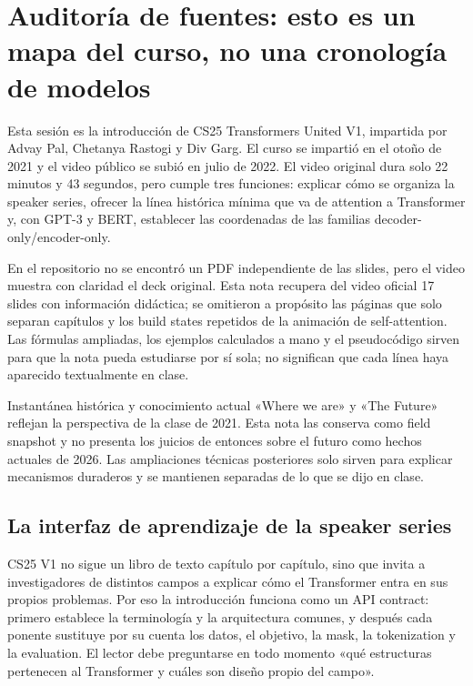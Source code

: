 \section{Auditoría de fuentes: esto es un mapa del curso, no una cronología de modelos}

Esta sesión es la introducción de CS25 Transformers United V1, impartida por Advay Pal, Chetanya Rastogi y Div Garg. El curso se impartió en el otoño de 2021 y el video público se subió en julio de 2022. El video original dura solo 22 minutos y 43 segundos, pero cumple tres funciones: explicar cómo se organiza la speaker series, ofrecer la línea histórica mínima que va de attention a Transformer y, con GPT-3 y BERT, establecer las coordenadas de las familias decoder-only/encoder-only.

En el repositorio no se encontró un PDF independiente de las slides, pero el video muestra con claridad el deck original. Esta nota recupera del video oficial 17 slides con información didáctica; se omitieron a propósito las páginas que solo separan capítulos y los build states repetidos de la animación de self-attention. Las fórmulas ampliadas, los ejemplos calculados a mano y el pseudocódigo sirven para que la nota pueda estudiarse por sí sola; no significan que cada línea haya aparecido textualmente en clase.

\begin{warningbox}{Instantánea histórica y conocimiento actual}
«Where we are» y «The Future» reflejan la perspectiva de la clase de 2021. Esta nota las conserva como field snapshot y no presenta los juicios de entonces sobre el futuro como hechos actuales de 2026. Las ampliaciones técnicas posteriores solo sirven para explicar mecanismos duraderos y se mantienen separadas de lo que se dijo en clase.
\end{warningbox}

\subsection{La interfaz de aprendizaje de la speaker series}

CS25 V1 no sigue un libro de texto capítulo por capítulo, sino que invita a investigadores de distintos campos a explicar cómo el Transformer entra en sus propios problemas. Por eso la introducción funciona como un API contract: primero establece la terminología y la arquitectura comunes, y después cada ponente sustituye por su cuenta los datos, el objetivo, la mask, la tokenization y la evaluation. El lector debe preguntarse en todo momento «qué estructuras pertenecen al Transformer y cuáles son diseño propio del campo».

